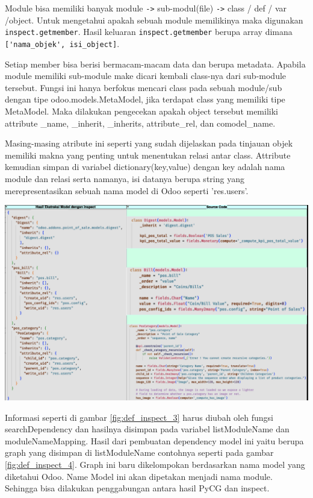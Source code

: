 Module bisa memiliki banyak module \verb|->| sub-modul(file) \verb|->| class / def / var /object. Untuk mengetahui apakah sebuah module memilikinya maka digunakan \verb|inspect.getmember|. Hasil keluaran \verb|inspect.getmember| berupa array dimana \verb|['nama_objek', isi_object]|. 

Setiap member bisa berisi bermacam-macam data dan berupa metadata. Apabila module memiliki sub-module make dicari kembali class-nya dari sub-module tersebut. Fungsi ini hanya berfokus mencari class pada sebuah module/sub dengan tipe odoo.models.MetaModel, jika terdapat class yang memiliki tipe MetaModel. Maka dilakukan pengecekan apakah object tersebut memiliki attribute {\_}name, {\_}inherit, {\_}inherits, attribute{\_}rel, dan comodel{\_}name. 

Masing-masing atribute ini seperti yang sudah dijelaskan pada tinjauan objek memiliki makna yang penting untuk menentukan relasi antar class. Attribute kemudian simpan di variabel dictionary(key,value) dengan key adalah nama module dan relasi serta namanya, isi datanya berupa string yang merepresentasikan sebuah nama model di Odoo seperti 'res.users'. 

\begin{center}
	\includegraphics[width=14cm]{img/bab_4/def_inspect_3.png}
	\label{fig:def_inspect_3}
\end{center}

Informasi seperti di gambar \ref{fig:def_inspect_3} harus diubah oleh fungsi searchDependency dan hasilnya disimpan pada variabel listModuleName dan moduleNameMapping.
Hasil dari pembuatan dependency model ini yaitu berupa graph yang disimpan di listModuleName contohnya seperti pada gambar \ref{fig:def_inspect_4}. Graph ini baru dikelompokan berdasarkan nama model yang diketahui Odoo. Name Model ini akan dipetakan menjadi nama module. Sehingga bisa dilakukan penggabungan antara hasil PyCG dan inspect.

